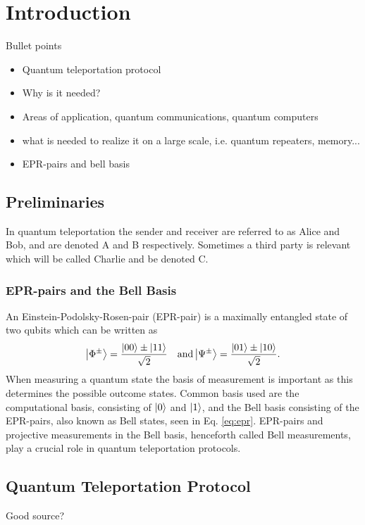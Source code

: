 \section{Introduction}
\begin{mybox}{Bullet points}
    \begin{itemize}
        \item Quantum teleportation protocol
        \item Why is it needed?
        \item Areas of application, quantum communications, quantum computers
        \item what is needed to realize it on a large scale, i.e. quantum repeaters, memory...
        \item EPR-pairs and bell basis
    \end{itemize}
\end{mybox}
\subsection{Preliminaries}
In quantum teleportation the sender and receiver are referred to as Alice and Bob, and are denoted A and B respectively. Sometimes a third party is relevant which will be called Charlie and be denoted C.

\subsubsection{EPR-pairs and the Bell Basis}
An Einstein-Podolsky-Rosen-pair (EPR-pair) is a maximally entangled state of two qubits \cite{Nielsen:2010} which can be written as
\begin{equation}
    \ket{\Phi^\pm} = \frac{\ket{00} \pm \ket{11}}{\sqrt{2}} \quad \text{and} \ket{\Psi^\pm} = \frac{\ket{01} \pm \ket{10}}{\sqrt{2}}.\label{eq:epr}
\end{equation}
When measuring a quantum state the basis of measurement is important as this determines the possible outcome states. Common basis used are the computational basis, consisting of $\ket{0}$ and $\ket{1}$, and the Bell basis consisting of the EPR-pairs, also known as Bell states, seen in Eq. \eqref{eq:epr}. EPR-pairs and projective measurements in the Bell basis, henceforth called Bell measurements, play a crucial role in quantum teleportation protocols. \cite{Nielsen:2010}


\subsection{Quantum Teleportation Protocol}
Good source? \cite{Bennett:1993}

